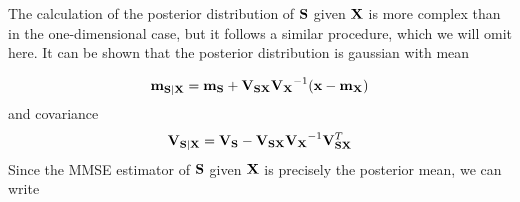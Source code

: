 {%

The calculation of the posterior distribution of ${\bf S}$ given ${\bf X}$ is more complex than in the one-dimensional case, but it follows a similar procedure, which we will omit here. It can be shown that the posterior distribution is gaussian with mean

\begin{align}
{\bf m}_{{\bf S}|{\bf X}} 
      = {\bf m}_{\bf S} + {\bf V}_{\bf SX}{\bf V_X}^{-1}({\bf x}-{\bf m}_{\bf X}) 
\label{Est:sMMSEgaussMN}
\end{align}
\noindent and covariance
\begin{align}
{\bf V}_{{\bf S}|{\bf X}} 
      = {\bf V_S}- {\bf V}_{\bf SX}{\bf V_X}^{-1}{\bf V}_{\bf SX}^T
\end{align}
Since the MMSE estimator of ${\bf S}$ given ${\bf X}$ is precisely the posterior mean, we can write

}
